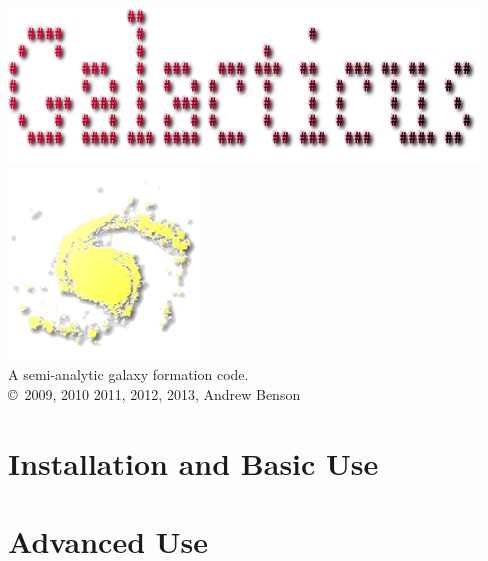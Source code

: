 \documentclass[letterpaper,10pt,headsepline]{scrbook}
\begin{document}
\lstset{language=[95]Fortran}

\frontmatter

\pagestyle{empty}
\begin{center}
\includegraphics[width=125mm]{GalacticusLogo.png}\\

\includegraphics{New_Logo_Galaxy_192_Transparent.png}\\
A semi-analytic galaxy formation code.\\

\copyright\ 2009, 2010 2011, 2012, 2013, Andrew Benson
\end{center}

\tableofcontents

\mainmatter
\pagestyle{headings}

\part{Installation and Basic Use}

















\part{Advanced Use}
\end{document}

